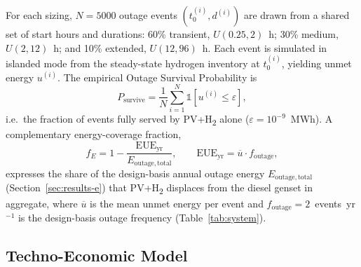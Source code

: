 \documentclass[conference]{IEEEtran}
\begin{document}
For each sizing, $N=5000$ outage events $(t_0^{(i)}, d^{(i)})$ are drawn from a shared set of start hours and durations: 60\% transient, $U(0.25,2)$~h; 30\% medium, $U(2,12)$~h; and 10\% extended, $U(12,96)$~h. Each event is simulated in islanded mode from the steady-state hydrogen inventory at $t_0^{(i)}$, yielding unmet energy $u^{(i)}$. The empirical Outage Survival Probability is
\begin{equation}
P_{\mathrm{survive}} = \frac{1}{N}\sum_{i=1}^{N} \mathbb{1}\!\left[u^{(i)} \le \varepsilon\right],
\label{eq:psurvive}
\end{equation}
i.e.\ the fraction of events fully served by PV+H\textsubscript{2} alone ($\varepsilon=10^{-9}$~MWh). A complementary energy-coverage fraction,
\begin{equation}
f_E = 1 - \frac{\mathrm{EUE}_{\mathrm{yr}}}{E_{\mathrm{outage,total}}},
\qquad
\mathrm{EUE}_{\mathrm{yr}} = \overline{u}\cdot f_{\mathrm{outage}},
\label{eq:fE}
\end{equation}
expresses the share of the design-basis annual outage energy $E_{\mathrm{outage,total}}$ (Section~\ref{sec:results-e}) that PV+H\textsubscript{2} displaces from the diesel genset in aggregate, where $\overline{u}$ is the mean unmet energy per event and $f_{\mathrm{outage}}=2$~events~yr$^{-1}$ is the design-basis outage frequency (Table~\ref{tab:system}).

\subsection{Techno-Economic Model}
\label{sec:techno}
\end{document}
